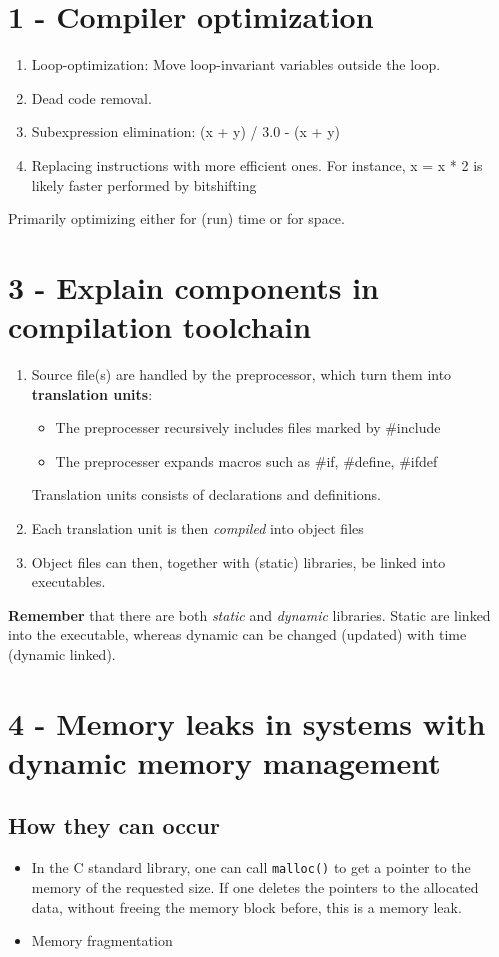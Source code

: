 \documentclass{article}
\begin{document}
\section*{1 - Compiler optimization}
\begin{enumerate}
	\item Loop-optimization: Move loop-invariant variables outside the loop.
	\item Dead code removal.
	\item Subexpression elimination: (x + y) / 3.0 - (x + y)
	\item Replacing instructions with more efficient ones. For instance, x = x * 2 is likely faster performed by bitshifting
\end{enumerate}

Primarily optimizing either for (run) time or for space.



\section*{3 - Explain components in compilation toolchain}
\begin{enumerate}
	\item Source file(s) are handled by the preprocessor, which turn them into \textbf{translation units}:
	\begin{itemize}
		\item The preprocesser recursively includes files marked by \#include
		\item The preprocesser expands macros such as \#if, \#define, \#ifdef
	\end{itemize}
	Translation units consists of declarations and definitions.
	\item Each translation unit is then \emph{compiled} into object files
	\item Object files can then, together with (static) libraries, be linked into executables.
\end{enumerate}

\textbf{Remember} that there are both \emph{static} and \emph{dynamic} libraries. Static are linked into the executable, whereas dynamic can be changed (updated) with time (dynamic linked).


\section*{4 - Memory leaks in systems with dynamic memory management}
\subsection*{How they can occur}
\begin{itemize}
	\item In the C standard library, one can call \texttt{malloc()} to get a pointer to the memory of the requested size.
 If one deletes the pointers to the allocated data, without freeing the memory block before, this is a memory leak. 
 
 	\item Memory fragmentation
\end{itemize}
\end{document}
